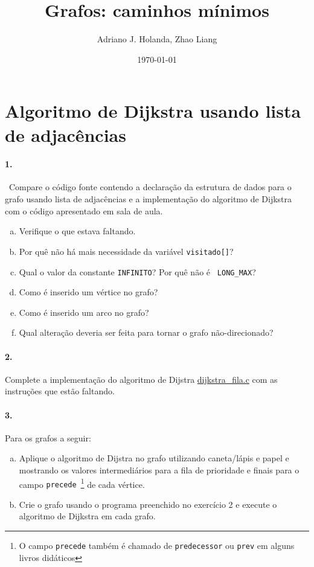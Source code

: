 \documentclass[12pt]{article}
\begin{document}
\title{Grafos: caminhos mínimos}
\author{Adriano J. Holanda, Zhao Liang}
\date{\today}
\maketitle

\section*{Algoritmo de Dijkstra usando lista de adjacências}

\paragraph{1.}~Compare o código fonte contendo a declaração da
estrutura de dados para o grafo usando lista de adjacências e a
implementação do algoritmo de Dijkstra com o código apresentado em
sala de aula.
\begin{enumerate}[a)]
\item Verifique o que estava faltando.
\item Por quê não há mais necessidade da variável {\tt visitado[]}?
\item Qual o valor da constante {\tt INFINITO}? Por quê não é {\tt
  LONG\_MAX}?
\item Como é inserido um vértice no grafo?
\item Como é inserido um arco no grafo?
\item Qual alteração deveria ser feita para tornar o grafo
  não-direcionado?
\end{enumerate}

\paragraph{2.} Complete a implementação do algoritmo de Dijstra
\href{https://drive.google.com/open?id=1yHk413g7MF2NU4v6MqLlEQrrmnYkfVU9}{dijkstra\_fila.c}
com as instruções que estão faltando.

\pagebreak
\paragraph{3.} Para os grafos a seguir:

\begin{enumerate}[a)]
\item Aplique o algoritmo de Dijstra no grafo utilizando caneta/lápis
  e papel e mostrando os valores intermediários para a fila de
  prioridade e finais para o campo {\tt precede}~\footnote{O campo
    {\tt precede} também é chamado de {\tt predecessor} ou {\tt prev}
    em alguns livros didáticos} de cada vértice.

\item Crie o grafo usando o programa preenchido no exercício 2 e
  execute o algoritmo de Dijkstra em cada grafo.

\end{enumerate}
\end{document}
